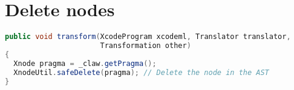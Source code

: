 \section{Delete nodes}
\begin{lstlisting}[label=lst:delete_node, language=Java, 
  caption=XcodeML delete node example]
public void transform(XcodeProgram xcodeml, Translator translator,
                      Transformation other)
{
  Xnode pragma = _claw.getPragma();
  XnodeUtil.safeDelete(pragma); // Delete the node in the AST
}
\end{lstlisting}


